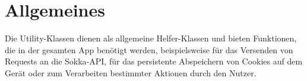 \section{Allgemeines}

Die Utility-Klassen dienen als allgemeine Helfer-Klassen und bieten 
Funktionen, die in der gesamten App benötigt werden, beispielsweise
für das Versenden von Requests an die Sokka-API, für das persistente
Abspeichern von Cookies auf dem Gerät oder zum Verarbeiten bestimmter
Aktionen durch den Nutzer.